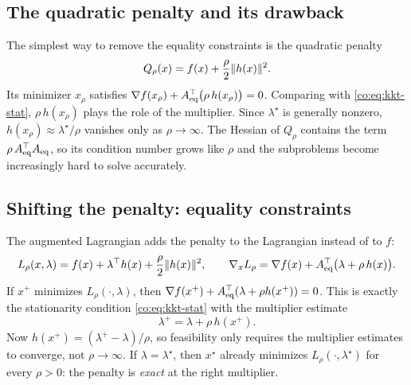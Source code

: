 \subsection{The quadratic penalty and its drawback}
The simplest way to remove the equality constraints is the quadratic penalty
\[
  Q_\rho(x) = f(x) + \frac{\rho}{2}\lVert h(x)\rVert^2 .
\]
Its minimizer $x_\rho$ satisfies $\nabla f(x_\rho) + A_{\mathrm{eq}}^\top\big(\rho\,h(x_\rho)\big) = 0$.
Comparing with \eqref{co:eq:kkt-stat}, $\rho\,h(x_\rho)$ plays the role of the
multiplier. Since $\lambda^\star$ is generally nonzero, $h(x_\rho)\approx\lambda^\star/\rho$
vanishes only as $\rho\to\infty$. The Hessian of $Q_\rho$ contains the term
$\rho\,A_{\mathrm{eq}}^\top A_{\mathrm{eq}}$, so its condition number grows like $\rho$ and the
subproblems become increasingly hard to solve accurately.

\subsection{Shifting the penalty: equality constraints}
The augmented Lagrangian adds the penalty to the Lagrangian instead of to $f$:
\begin{equation}\label{co:eq:al-eq}
  L_\rho(x,\lambda) = f(x) + \lambda^\top h(x) + \frac{\rho}{2}\lVert h(x)\rVert^2 ,
  \qquad
  \nabla_x L_\rho = \nabla f(x) + A_{\mathrm{eq}}^\top\big(\lambda + \rho\,h(x)\big).
\end{equation}
If $x^+$ minimizes $L_\rho(\cdot,\lambda)$, then
$\nabla f(x^+) + A_{\mathrm{eq}}^\top(\lambda+\rho h(x^+)) = 0$. This is exactly the
stationarity condition \eqref{co:eq:kkt-stat} with the multiplier estimate
\begin{equation}\label{co:eq:update-eq}
  \lambda^+ = \lambda + \rho\, h(x^+).
\end{equation}
Now $h(x^+) = (\lambda^+-\lambda)/\rho$, so feasibility only requires the
multiplier estimates to converge, not $\rho\to\infty$. If $\lambda=\lambda^\star$,
then $x^\star$ already minimizes $L_\rho(\cdot,\lambda^\star)$ for every
$\rho>0$: the penalty is \emph{exact} at the right multiplier.

